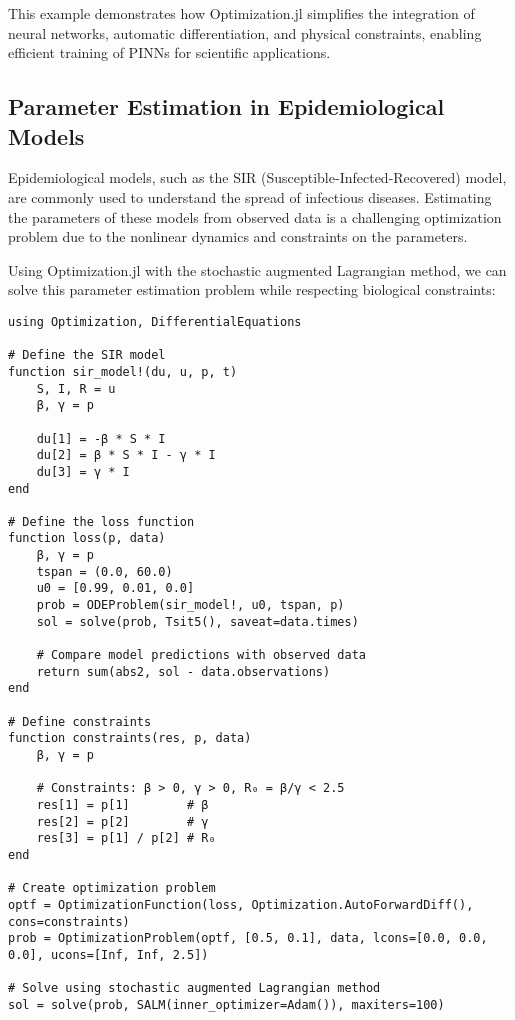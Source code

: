 This example demonstrates how Optimization.jl simplifies the integration of neural networks, automatic differentiation, and physical constraints, enabling efficient training of PINNs for scientific applications.

\subsection{Parameter Estimation in Epidemiological Models}

Epidemiological models, such as the SIR (Susceptible-Infected-Recovered) model, are commonly used to understand the spread of infectious diseases. Estimating the parameters of these models from observed data is a challenging optimization problem due to the nonlinear dynamics and constraints on the parameters.

Using Optimization.jl with the stochastic augmented Lagrangian method, we can solve this parameter estimation problem while respecting biological constraints:

\begin{verbatim}
using Optimization, DifferentialEquations

# Define the SIR model
function sir_model!(du, u, p, t)
    S, I, R = u
    β, γ = p
    
    du[1] = -β * S * I
    du[2] = β * S * I - γ * I
    du[3] = γ * I
end

# Define the loss function
function loss(p, data)
    β, γ = p
    tspan = (0.0, 60.0)
    u0 = [0.99, 0.01, 0.0]
    prob = ODEProblem(sir_model!, u0, tspan, p)
    sol = solve(prob, Tsit5(), saveat=data.times)
    
    # Compare model predictions with observed data
    return sum(abs2, sol - data.observations)
end

# Define constraints
function constraints(res, p, data)
    β, γ = p
    
    # Constraints: β > 0, γ > 0, R₀ = β/γ < 2.5
    res[1] = p[1]        # β
    res[2] = p[2]        # γ
    res[3] = p[1] / p[2] # R₀
end

# Create optimization problem
optf = OptimizationFunction(loss, Optimization.AutoForwardDiff(), cons=constraints)
prob = OptimizationProblem(optf, [0.5, 0.1], data, lcons=[0.0, 0.0, 0.0], ucons=[Inf, Inf, 2.5])

# Solve using stochastic augmented Lagrangian method
sol = solve(prob, SALM(inner_optimizer=Adam()), maxiters=100)
\end{verbatim}

